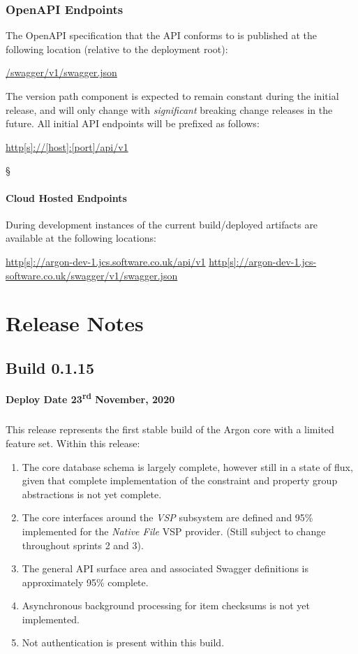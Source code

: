 \documentclass{book}
\begin{document}
\subsection{OpenAPI Endpoints}
The OpenAPI specification that the API conforms to is published at the following location (relative to the deployment root):
\begin{center}
    \url{/swagger/v1/swagger.json}
\end{center}
The version path component is expected to remain constant during the initial release, and will only change with \textit{significant} breaking change releases in the future.
All initial API endpoints will be prefixed as follows:
\begin{center}
    \url{http[s]://[host]:[port]/api/v1}
\end{center}§
\subsubsection{Cloud Hosted Endpoints}
During development instances of the current build/deployed artifacts are available at the following locations:
\begin{center}
    \url{http[s]://argon-dev-1.jcs.software.co.uk/api/v1}
    \url{http[s]://argon-dev-1.jcs-software.co.uk/swagger/v1/swagger.json}
\end{center}
\chapter{Release Notes}
\section{Build 0.1.15}
\textbf{Deploy Date 23\textsuperscript{rd} November, 2020}
\paragraph{}
This release represents the first stable build of the Argon core with a limited feature set.  Within this release:
\begin{enumerate}
    \item The core database schema is largely complete, however still in a state of flux, given that complete implementation of the constraint and property group abstractions is not yet complete.
    \item The core interfaces around the \textit{VSP} subsystem are defined and 95\% implemented for the \textit{Native File} VSP provider.  (Still subject to change throughout sprints 2 and 3).
    \item The general API surface area and associated Swagger definitions is approximately 95\% complete.
    \item Asynchronous background processing for item checksums is not yet implemented.
    \item Not authentication is present within this build. 
\end{enumerate}
\end{document}
